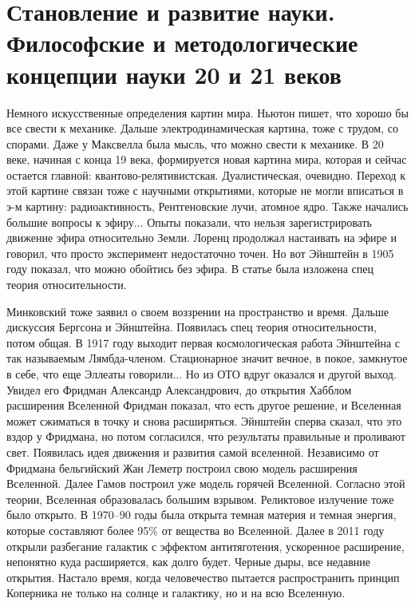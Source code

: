 \documentclass[a4paper, 12pt]{article}
\begin{document}

\section{Становление и развитие науки. Философские и методологические 
концепции науки 20 и 21 веков}


Немного искусственные определения картин мира. Ньютон пишет, что хорошо 
бы все свести к механике. Дальше электродинамическая картина, тоже 
с трудом, со спорами. Даже у Максвелла была мысль, что можно свести 
к механике. В 20 веке, начиная с конца 19 века, формируется новая 
картина мира, которая и сейчас остается главной: 
квантово-релятивистская. Дуалистическая, очевидно. Переход к этой 
картине связан тоже с научными открытиями, которые не могли вписаться 
в э-м картину: радиоактивность, Рентгеновские лучи, атомное ядро. Также 
начались большие вопросы к эфиру... Опыты показали, что нельзя 
зарегистрировать движение эфира относительно Земли. Лоренц продолжал 
настаивать на эфире и говорил, что просто эксперимент недостаточно 
точен. Но вот Эйнштейн в 1905 году показал, что можно обойтись без 
эфира. В статье была изложена спец теория относительности.

Минковский тоже заявил о своем воззрении на пространство и время. Дальше 
дискуссия Бергсона и Эйнштейна. Появилась спец теория относительности, 
потом общая. В 1917 году выходит первая космологическая работа Эйнштейна 
с так называемым Лямбда-членом. Стационарное значит вечное, в покое, 
замкнутое в себе, что еще Эллеаты говорили... Но из ОТО вдруг оказался 
и другой выход. Увидел его Фридман Александр Александрович, до открытия 
Хабблом расширения Вселенной Фридман показал, что есть другое решение, 
и Вселенная может сжиматься в точку и снова расширяться. Эйнштейн сперва 
сказал, что это вздор у Фридмана, но потом согласился, что результаты 
правильные и проливают свет. Появилась идея движения и развития самой 
вселенной. Независимо от Фридмана бельгийский Жан Леметр построил свою 
модель расширения Вселенной. Далее Гамов построил уже модель горячей 
Вселенной. Согласно этой теории, Вселенная образовалась большим взрывом. 
Реликтовое излучение тоже было открыто. В 1970--90 годы была открыта 
темная материя и темная энергия, которые составляют более 95\% от 
вещества во Вселенной. Далее в 2011 году открыли разбегание галактик 
с эффектом антитяготения, ускоренное расширение, непонятно куда 
расширяется, как долго будет. Черные дыры, все недавние открытия. 
Настало время, когда человечество пытается распространить принцип 
Коперника не только на солнце и галактику, но и на всю Вселенную.
\end{document}
